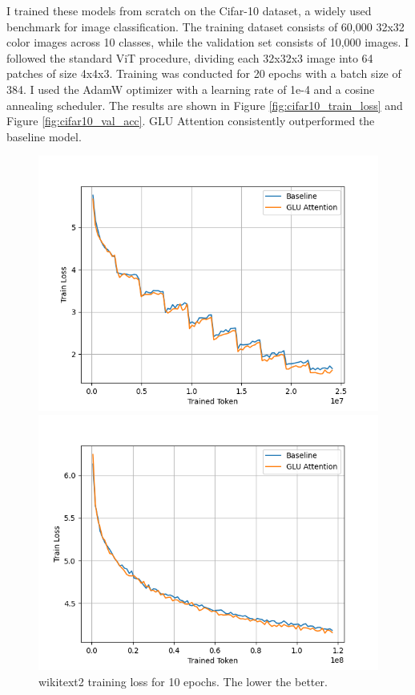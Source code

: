 \documentclass[11pt]{article}
\begin{document}
I trained these models from scratch on the Cifar-10 dataset, a widely used benchmark for image classification. The training dataset consists of 60,000 32x32 color images across 10 classes, while the validation set consists of 10,000 images. I followed the standard ViT\cite{dosovitskiy2021imageworth16x16words} procedure, dividing each 32x32x3 image into 64 patches of size 4x4x3. Training was conducted for 20 epochs with a batch size of 384. I used the AdamW optimizer with a learning rate of 1e-4 and a cosine annealing scheduler. The results are shown in Figure \ref{fig:cifar10_train_loss} and Figure \ref{fig:cifar10_val_acc}. GLU Attention consistently outperformed the baseline model.


\begin{figure}[htbp]
    \centering
    \begin{minipage}{0.49\textwidth}
        \centering
        \includegraphics[width=\textwidth]{wikitext2_train_loss.png}
        \caption{wikitext2 training loss for 10 epochs. The lower the better.}
        \label{fig:wikitext2_train_loss}
    \end{minipage}
    \begin{minipage}{0.49\textwidth}
        \centering
        \includegraphics[width=\textwidth]{wikitext103_train_loss.png}

\end{minipage}
\end{figure}
\end{document}
